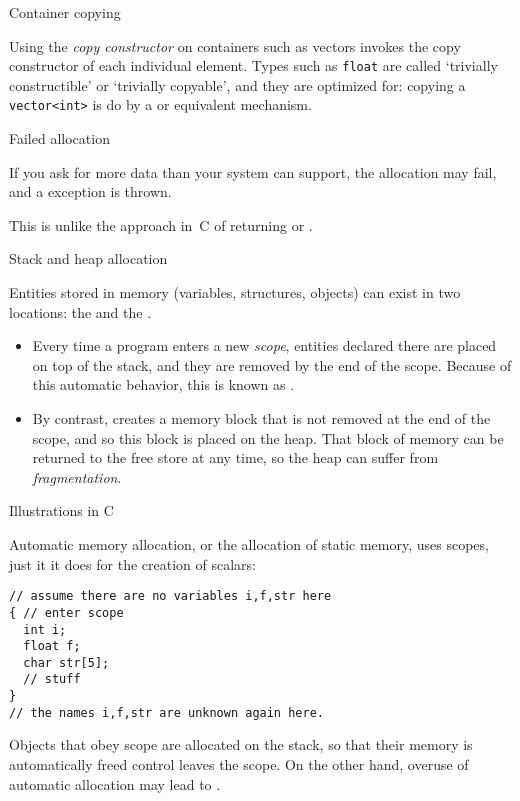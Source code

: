  {Container copying}

Using the
\emph{copy constructor}
on containers such as vectors invokes the copy constructor
of each individual element.
Types such as \lstinline{float} are called
`trivially constructible' or `trivially copyable',
and they are optimized for:
copying a \lstinline{vector<int>} is
do by a  or equivalent mechanism.

 {Failed allocation}

If you ask for more data than your system can support,
the allocation may fail, and a 
exception is thrown.

This is unlike the approach in~C of returning
 or .

 {Stack and heap allocation}
\label{sec:stack-heap}

Entities stored in memory (variables, structures, objects) can exist
in two locations: the  and the
.
\begin{itemize}
\item Every time a program enters a new
  \emph{scope}, entities declared there are
  placed on top of the stack, and they are removed by the end of the
  scope. Because of this automatic behavior,
  this is known as .
\item By contrast, 
  creates a memory block that is not removed at the end of the scope,
  and so this block is placed on the heap.
  That block of memory can be returned to the free store at any
  time, so the heap can suffer from
  \emph{fragmentation}.
\end{itemize}

 {Illustrations in C}

Automatic memory allocation, or the allocation of static memory,
uses scopes, just it it does for the creation of scalars:
\begin{lstlisting}
// assume there are no variables i,f,str here
{ // enter scope
  int i;
  float f;
  char str[5];
  // stuff
}
// the names i,f,str are unknown again here.
\end{lstlisting}
Objects that obey scope are allocated on the stack, so that
their memory is automatically freed control leaves the scope.
On the other hand, overuse of automatic allocation
may lead to .

